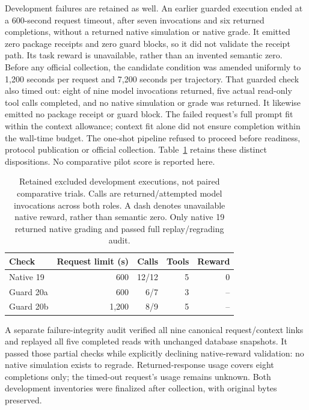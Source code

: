 Development failures are retained as well. An earlier guarded execution ended at a 600-second request timeout, after seven invocations and six returned completions, without a returned native simulation or native grade. It emitted zero package receipts and zero guard blocks, so it did not validate the receipt path. Its task reward is unavailable, rather than an invented semantic zero. Before any official collection, the candidate condition was amended uniformly to 1,200 seconds per request and 7,200 seconds per trajectory. That guarded check also timed out: eight of nine model invocations returned, five actual read-only tool calls completed, and no native simulation or grade was returned. It likewise emitted no package receipt or guard block. The failed request's full prompt fit within the context allowance; context fit alone did not ensure completion within the wall-time budget. The one-shot pipeline refused to proceed before readiness, protocol publication or official collection. Table~\ref{tab:native-development} retains these distinct dispositions. No comparative pilot score is reported here.

\begin{table}[t]
\caption{Retained excluded development executions, not paired comparative trials. Calls are returned/attempted model invocations across both roles. A dash denotes unavailable native reward, rather than semantic zero. Only native 19 returned native grading and passed full replay/regrading audit.}
\label{tab:native-development}
\centering\small
\setlength{\tabcolsep}{4pt}
\begin{tabular}{lrrrr}
\toprule
Check & Request limit (s) & Calls & Tools & Reward \\
\midrule
Native 19 & 600 & 12/12 & 5 & 0 \\
Guard 20a & 600 & 6/7 & 3 & -- \\
Guard 20b & 1,200 & 8/9 & 5 & -- \\
\bottomrule
\end{tabular}
\end{table}

A separate failure-integrity audit verified all nine canonical request/context links and replayed all five completed reads with unchanged database snapshots. It passed those partial checks while explicitly declining native-reward validation: no native simulation exists to regrade. Returned-response usage covers eight completions only; the timed-out request's usage remains unknown. Both development inventories were finalized after collection, with original bytes preserved.

